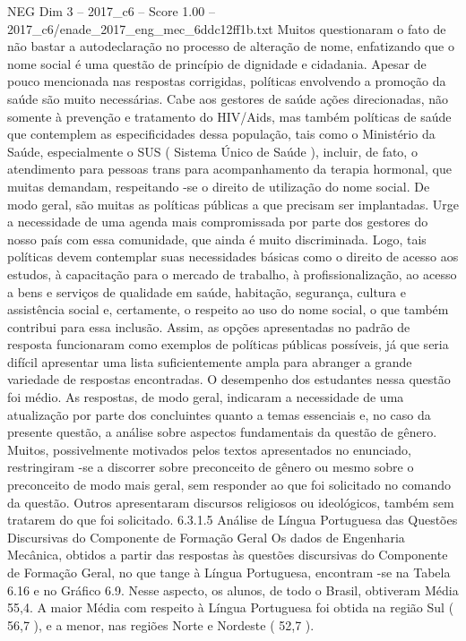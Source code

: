 \begin{textsample}{NEG Dim 3 – 2017\_c6 – Score 1.00 – 2017\_c6/enade\_2017\_eng\_mec\_6ddc12ff1b.txt}
Muitos questionaram o fato de não bastar a autodeclaração no processo de alteração de nome, enfatizando que o nome social é uma questão de princípio de dignidade e cidadania.
Apesar de pouco mencionada nas respostas corrigidas, políticas envolvendo a promoção da saúde são muito necessárias.
Cabe aos gestores de saúde ações direcionadas, não somente à prevenção e tratamento do HIV/Aids, mas também políticas de saúde que contemplem as especificidades dessa população, tais como o Ministério da Saúde, especialmente o SUS ( Sistema Único de Saúde ), incluir, de fato, o atendimento para pessoas trans para acompanhamento da terapia hormonal, que muitas demandam, respeitando -se o direito de utilização do nome social.
De modo geral, são muitas as políticas públicas a que precisam ser implantadas.
Urge a necessidade de uma agenda mais compromissada por parte dos gestores do nosso país com essa comunidade, que ainda é muito discriminada.
Logo, tais políticas devem contemplar suas necessidades básicas como o direito de acesso aos estudos, à capacitação para o mercado de trabalho, à profissionalização, ao acesso a bens e serviços de qualidade em saúde, habitação, segurança, cultura e assistência social e, certamente, o respeito ao uso do nome social, o que também contribui para essa inclusão.
Assim, as opções apresentadas no padrão de resposta funcionaram como exemplos de políticas públicas possíveis, já que seria difícil apresentar uma lista suficientemente ampla para abranger a grande variedade de respostas encontradas.
O desempenho dos estudantes nessa questão foi médio.
As respostas, de modo geral, indicaram a necessidade de uma atualização por parte dos concluintes quanto a temas essenciais e, no caso da presente questão, a análise sobre aspectos fundamentais da questão de gênero.
Muitos, possivelmente motivados pelos textos apresentados no enunciado, restringiram -se a discorrer sobre preconceito de gênero ou mesmo sobre o preconceito de modo mais geral, sem responder ao que foi solicitado no comando da questão.
Outros apresentaram discursos religiosos ou ideológicos, também sem tratarem do que foi solicitado. 6.3.1.5 Análise de Língua Portuguesa das Questões Discursivas do Componente de Formação Geral Os dados de Engenharia Mecânica, obtidos a partir das respostas às questões discursivas do Componente de Formação Geral, no que tange à Língua Portuguesa, encontram -se na Tabela 6.16 e no Gráfico 6.9.
Nesse aspecto, os alunos, de todo o Brasil, obtiveram Média 55,4.
A maior Média com respeito à Língua Portuguesa foi obtida na região Sul ( 56,7 ), e a menor, nas regiões Norte e Nordeste ( 52,7 ).

\end{textsample}
